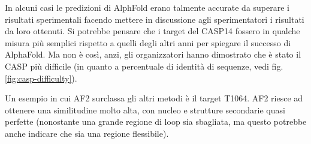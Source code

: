 In alcuni casi le predizioni di AlphFold erano talmente accurate da superare i risultati sperimentali facendo mettere in discussione agli sperimentatori i risultati da loro ottenuti. Si potrebbe pensare che i target del CASP14 fossero in qualche misura più semplici rispetto a quelli degli altri anni per spiegare il successo di AlphaFold. Ma non è così, anzi, gli organizzatori hanno dimostrato che è stato il CASP più difficile (in quanto a percentuale di identità di sequenze, vedi fig. \ref{fig:casp-difficulty}).

Un esempio in cui AF2 surclassa gli altri metodi è il target T1064. AF2 riesce ad ottenere una similitudine molto alta, con nucleo e strutture secondarie quasi perfette (nonostante una grande regione di loop sia sbagliata, ma questo potrebbe anche indicare che sia una regione flessibile).

